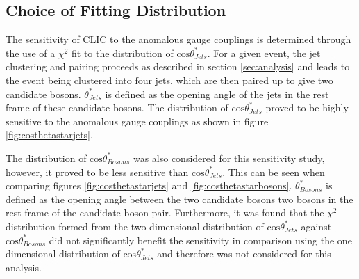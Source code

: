 \subsection{Choice of Fitting Distribution}
The sensitivity of CLIC to the anomalous gauge couplings is determined through the use of a $\chi^{2}$ fit to the distribution of $\text{cos}\theta^{*}_{Jets}$.  For a given event, the jet clustering and pairing proceeds as described in section \ref{sec:analysis} and leads to the event being clustered into four jets, which are then paired up to give two candidate bosons.  $\theta^{*}_{Jets}$ is defined as the opening angle of the jets in the rest frame of these candidate bosons.  The distribution of $\text{cos}\theta^{*}_{Jets}$ proved to be highly sensitive to the anomalous gauge couplings as shown in figure \ref{fig:costhetastarjets}.

The distribution of $\text{cos}\theta^{*}_{Bosons}$ was also considered for this sensitivity study, however, it proved to be less sensitive than $\text{cos}\theta^{*}_{Jets}$.  This can be seen when comparing figures \ref{fig:costhetastarjets} and \ref{fig:costhetastarbosons}.  $\theta^{*}_{Bosons}$ is defined as the opening angle between the two candidate bosons two bosons in the rest frame of the candidate boson pair.  Furthermore, it was found that the $\chi^{2}$ distribution formed from the two dimensional distribution of $\text{cos}\theta^{*}_{Jets}$ against $\text{cos}\theta^{*}_{Bosons}$ did not significantly benefit the sensitivity in comparison using the one dimensional distribution of $\text{cos}\theta^{*}_{Jets}$ and therefore was not considered for this analysis.

